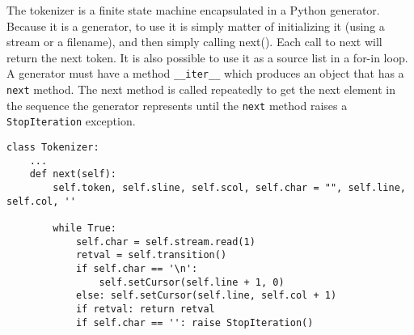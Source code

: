 \documentclass[]{article}
\begin{document}
  The tokenizer is a finite state machine encapsulated in a Python generator.
  Because it is a generator, to use it is simply matter of initializing it
  (using a stream or a filename), and then simply calling next().  Each call to
  next will return the next token. It is also possible to use it as a source
  list in a for-in loop. A generator must have a method \verb+__iter__+ which
  produces an object that has a \verb+next+ method. The next method is called
  repeatedly to get the next element in the sequence the generator represents
  until the \verb+next+ method raises a \verb+StopIteration+ exception.

  \lstset{language=Python}
  \begin{lstlisting}
class Tokenizer:
    ...
    def next(self):
        self.token, self.sline, self.scol, self.char = "", self.line, self.col, ''

        while True:
            self.char = self.stream.read(1)
            retval = self.transition()
            if self.char == '\n':
                self.setCursor(self.line + 1, 0)
            else: self.setCursor(self.line, self.col + 1)
            if retval: return retval
            if self.char == '': raise StopIteration()
  \end{lstlisting}
\end{document}
